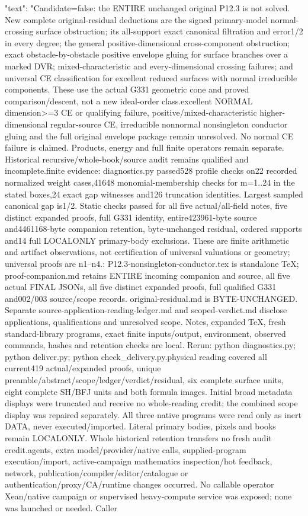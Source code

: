 \documentclass[11pt]{article}
\begin{document}
\begin{Full422Data}
{{      "text": "Candidate=false: the ENTIRE unchanged original P12.3 is not solved. New complete original-residual deductions are the signed primary-model normal-crossing surface obstruction; its all-support exact canonical filtration and error1/2 in every degree; the general positive-dimensional cross-component obstruction; exact obstacle-by-obstacle positive envelope gluing for surface branches over a marked DVR; mixed-characteristic and every-dimensional crossing failures; and universal CE classification for excellent reduced surfaces with normal irreducible components. These use the actual G331 geometric cone and proved comparison/descent, not a new ideal-order class.\n\nGeneral excellent NORMAL dimension>=3 CE or qualifying failure, positive/mixed-characteristic higher-dimensional regular-source CE, irreducible nonnormal nonsingleton conductor gluing and the full original envelope package remain unresolved. No normal CE failure is claimed. Products, energy and full finite operators remain separate. Historical recursive/whole-book/source audit remains qualified and incomplete.\n\nObserved finite evidence: diagnostics.py passed528 profile checks on22 recorded normalized weight cases,41648 monomial-membership checks for m=1..24 in the stated boxes,24 exact gap witnesses and126 truncation identities. Largest sampled canonical gap is1/2. Static checks passed for all five actual/all-field notes, five distinct expanded proofs, full G331 identity, entire423961-byte source and4461168-byte companion retention, byte-unchanged residual, ordered supports and14 full LOCALONLY primary-body exclusions. These are finite arithmetic and artifact observations, not certification of universal valuations or geometry; universal proofs are n1--n4.\n\nDeliverables: P12.3-nonsingleton-conductor.tex is standalone TeX; proof-companion.md retains ENTIRE incoming companion and source, all five actual FINAL JSONs, all five distinct expanded proofs, full qualified G331 and002/003 source/scope records. original-residual.md is BYTE-UNCHANGED. Separate source-application-reading-ledger.md and scoped-verdict.md disclose applications, qualifications and unresolved scope. Notes, expanded TeX, fresh standard-library programs, exact finite inputs/output, environment, observed commands, hashes and retention checks are local. Rerun: python diagnostics.py; python deliver.py; python check_delivery.py.\n\nFresh physical reading covered all current419 actual/expanded proofs, unique preamble/abstract/scope/ledger/verdict/residual, six complete surface units, eight complete SH/BFJ units and both formula images. Initial broad metadata displays were truncated and receive no whole-reading credit; the combined scope display was repaired separately. All three native programs were read only as inert DATA, never executed/imported. Literal primary bodies, pixels and books remain LOCALONLY. Whole historical retention transfers no fresh audit credit.\n\nNo agents, extra model/provider/native calls, supplied-program execution/import, active-campaign mathematics inspection/hot feedback, network, publication/compiler/editor/catalogue or authentication/proxy/CA/runtime changes occurred. No callable operator Xean/native campaign or supervised heavy-compute service was exposed; none was launched or needed. Caller }}
\end{Full422Data}
\end{document}
